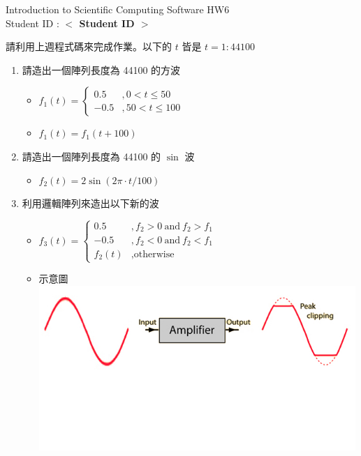 \documentclass[12pt,a4paper]{article}
\newcommand{\placeholder}[1]{\textbf{$<$ #1 $>$}}
\newcommand{\idnumber}{\placeholder{Student ID}}
\begin{document}
\begin{CJK}{UTF8}{bsmi}
\begin{flushleft}Introduction to Scientific Computing Software HW6
\\Student ID : \idnumber{}\end{flushleft}

請利用上週程式碼來完成作業。以下的 $t$ 皆是 $t=1:44100$
\begin{enumerate}
\item 請造出一個陣列長度為 44100 的方波
\begin{itemize} 


\item $f_1(t)=\left\{\begin{array}{ll}0.5&,0 < t\le50 \\ -0.5 &,50 < t \le 100\end{array}\right.$
\item $f_1(t)=f_1(t+100)$
\end{itemize}
\item 請造出一個陣列長度為 44100 的 $\sin$ 波
\begin{itemize}

\item $f_2(t)=2\sin(2\pi \cdot t/100)$
\end{itemize}

\item 利用邏輯陣列來造出以下新的波
\begin{itemize}

\item $f_3(t)=\left\{\begin{array}{ll}0.5&, f_2>0\ \mbox{and}\ f_2>f_1 \\ -0.5 &,f_2<0\ \mbox{and}\ f_2<f_1 \\f_2(t) & ,\mbox{otherwise} \end{array}\right.$
\item 示意圖 \\ \includegraphics[width=12cm]{amp2-1}
\end{itemize}
\end{enumerate}
\end{CJK}
\end{document}
